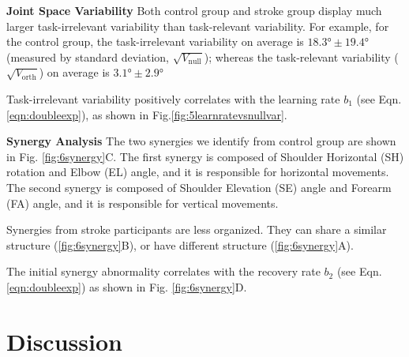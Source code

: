 \textbf{Joint Space Variability}
Both control group and stroke group display much larger task-irrelevant variability than task-relevant variability.
For example, for the control group, the task-irrelevant variability on average is $ \ang{18.3} \pm \ang{19.4} $ (measured by standard deviation, $ \sqrt{V_\text{null}} $); whereas the task-relevant variability ($ \sqrt{V_\text{orth}} $) on average is $ \ang{3.1} \pm \ang{2.9} $

Task-irrelevant variability positively correlates with the learning rate $ b_1 $ (see Eqn. \ref{eqn:doubleexp}), as shown in Fig.\ref{fig:5learnratevsnullvar}.

\textbf{Synergy Analysis}
The two synergies we identify from control group are shown in Fig. \ref{fig:6synergy}C.
The first synergy is composed of Shoulder Horizontal (SH) rotation and Elbow (EL) angle, and it is responsible for horizontal movements.
The second synergy is composed of Shoulder Elevation (SE) angle and Forearm (FA) angle, and it is responsible for vertical movements.

Synergies from stroke participants are less organized.
They can share a similar structure (\ref{fig:6synergy}B), or have different structure (\ref{fig:6synergy}A).

The initial synergy abnormality correlates with the recovery rate $ b_2 $ (see Eqn. \ref{eqn:doubleexp}) as shown in Fig. \ref{fig:6synergy}D.


\section{Discussion}



